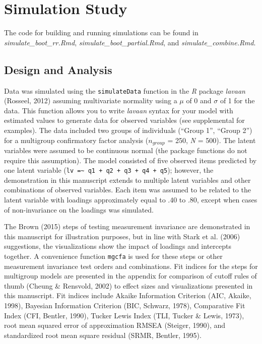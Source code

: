 \documentclass[
  man]{apa7}
\begin{document}
\section{Simulation Study}\label{simulation-study}

The code for building and running simulations can be found in \emph{simulate\_boot\_rr.Rmd}, \emph{simulate\_boot\_partial.Rmd}, and \emph{simulate\_combine.Rmd}.

\subsection{Design and Analysis}\label{design-and-analysis}

Data was simulated using the \texttt{simulateData} function in the \emph{R} package \emph{lavaan} (Rosseel, 2012) assuming multivariate normality using a \(\mu\) of 0 and \(\sigma\) of 1 for the data. This function allows you to write \emph{lavaan} syntax for your model with estimated values to generate data for observed variables (see supplemental for examples). The data included two groups of individuals (``Group 1'', ``Group 2'') for a multigroup confirmatory factor analysis (\(n_{group}\) = 250, \emph{N} = 500). The latent variables were assumed to be continuous normal (the package functions do not require this assumption). The model consisted of five observed items predicted by one latent variable (\texttt{lv\ =\textasciitilde{}\ q1\ +\ q2\ +\ q3\ +\ q4\ +\ q5}); however, the demonstration in this manuscript extends to multiple latent variables and other combinations of observed variables. Each item was assumed to be related to the latent variable with loadings approximately equal to .40 to .80, except when cases of non-invariance on the loadings was simulated.

The Brown (2015) steps of testing measurement invariance are demonstrated in this manuscript for illustration purposes, but in line with Stark et al. (2006) suggestions, the visualizations show the impact of loadings and intercepts together. A convenience function \texttt{mgcfa} is used for these steps or other measurement invariance test orders and combinations. Fit indices for the steps for multigroup models are presented in the appendix for comparison of cutoff rules of thumb (Cheung \& Rensvold, 2002) to effect sizes and visualizations presented in this manuscript. Fit indices include Akaike Information Criterion (AIC, Akaike, 1998), Bayesian Information Criterion (BIC, Schwarz, 1978), Comparative Fit Index (CFI, Bentler, 1990), Tucker Lewis Index (TLI, Tucker \& Lewis, 1973), root mean squared error of approximation RMSEA (Steiger, 1990), and standardized root mean square residual (SRMR, Bentler, 1995).
\end{document}
